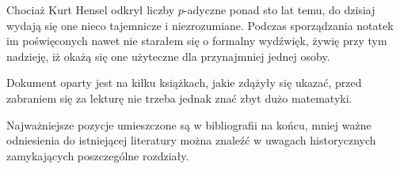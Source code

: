 Chociaż Kurt Hensel odkrył liczby $p$-adyczne ponad sto lat temu, do dzisiaj wydają się one nieco tajemnicze i niezrozumiane.
Podczas sporządzania notatek im poświęconych nawet nie starałem się o formalny wydźwięk, żywię przy tym nadzieję, iż okażą się one użyteczne dla przynajmniej jednej osoby. %

Dokument oparty jest na kilku książkach, jakie zdążyły się ukazać, przed zabraniem się za lekturę nie trzeba jednak znać zbyt dużo matematyki.

Najważniejsze pozycje umieszczone są w bibliografii na końcu, mniej ważne odniesienia do istniejącej literatury można znaleźć w uwagach historycznych zamykających poszczególne rozdziały.



